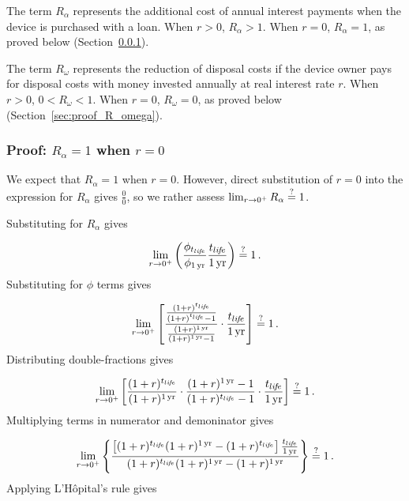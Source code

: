 The term $R_\alpha$ represents the additional cost of annual interest
payments when the device is purchased with a loan.
When $r > 0$, $R_\alpha > 1$.
When $r = 0$, $R_\alpha = 1$, as proved below
(Section~\ref{sec:proof_R_alpha}).

The term $R_\omega$ represents the reduction of disposal costs 
if the device owner pays for disposal costs with money
invested annually at real interest rate $r$. 
When $r > 0$, $0 < R_\omega < 1$.
When $r = 0$, $R_\omega = 0$, as proved below
(Section~\ref{sec:proof_R_omega}).


\subsubsection{Proof: $R_\alpha = 1$ when $r = 0$}
\label{sec:proof_R_alpha}

We expect that $R_\alpha = 1$ when $r = 0$.
However, direct substitution of $r = 0$ into the expression
for $R_\alpha$ gives $\frac{0}{0}$, 
so we rather assess
$\lim_{r \to 0^+} R_\alpha \stackrel{?}{=} 1$.

Substituting for $R_\alpha$ gives

\begin{equation}
  \lim_{r \to 0^+} \left( \frac{\phi_{t_{li\!f\!e}}}{\phi_{1\,\mathrm{yr}}} \frac{t_{li\!f\!e}}{1\,\mathrm{yr}} \right) 
  \stackrel{?}{=} 1\, .
\end{equation}
%
Substituting for $\phi$ terms gives

\begin{equation}
  \lim_{r \to 0^+} \left[ \frac{\frac{(1 + r)^{t_{li\!f\!e}}}{(1 + r)^{t_{li\!f\!e}} - 1}}{\frac{(1 + r)^{1\,\mathrm{yr}}}{(1 + r)^{1\,\mathrm{yr}} - 1}} \cdot \frac{t_{li\!f\!e}}{1\,\mathrm{yr}} \right] \stackrel{?}{=} 1 \, .
\end{equation}
%
Distributing double-fractions gives

\begin{equation}
  \lim_{r \to 0^+} \left[
  \frac{(1 + r)^{t_{li\!f\!e}}}{(1 + r)^{1\,\mathrm{yr}}} \cdot
  \frac{(1 + r)^{1\,\mathrm{yr}} - 1}{(1 + r)^{t_{li\!f\!e}} - 1} \cdot
  \frac{t_{li\!f\!e}}{1\,\mathrm{yr}}
  \right] \stackrel{?}{=} 1 \, .
\end{equation}
%
Multiplying terms in numerator and demoninator gives

\begin{equation}
  \lim_{r \to 0^+} \left\{
  \frac{\left[(1 + r)^{\tlife} (1 + r)^{\oneyr} - (1 + r)^{\tlife} \right] \frac{\tlife}{\oneyr}}{(1 + r)^{\tlife} (1 + r)^{\oneyr} - (1 + r)^{\oneyr}}
  \right\} \questionequal 1 \, .
\end{equation}
%
Applying L'H\^{o}pital's rule gives

